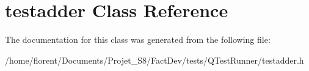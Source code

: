 \hypertarget{classtestadder}{\section{testadder Class Reference}
\label{classtestadder}
}


The documentation for this class was generated from the following file\-:\begin{DoxyCompactItemize}
\item 
/home/florent/\-Documents/\-Projet\-\_\-\-S8/\-Fact\-Dev/tests/\-Q\-Test\-Runner/testadder.\-h\end{DoxyCompactItemize}
